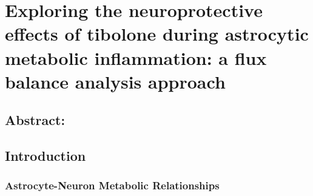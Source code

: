 \chapter{Exploring the neuroprotective effects of tibolone during astrocytic metabolic inflammation: a flux balance analysis approach}
\section*{Abstract:}
\section{Introduction}
\subsection*{Astrocyte-Neuron Metabolic Relationships}
